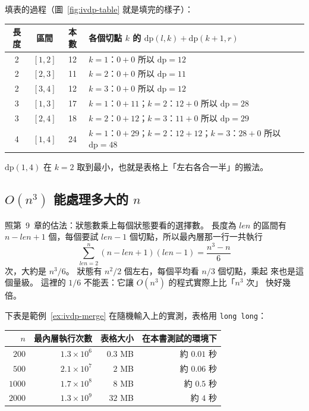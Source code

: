 填表的過程（圖~\ref{fig:ivdp-table} 就是填完的樣子）：

\begin{center}
\begin{tabular}{cccl}
\toprule
長度 & 區間 & 本數 & 各個切點 $k$ 的 $\mathrm{dp}(l, k) + \mathrm{dp}(k + 1, r)$ \\
\midrule
2 & $[1, 2]$ & 12 & $k = 1$：$0 + 0$ \quad 所以 $\mathrm{dp} = 12$ \\
2 & $[2, 3]$ & 11 & $k = 2$：$0 + 0$ \quad 所以 $\mathrm{dp} = 11$ \\
2 & $[3, 4]$ & 12 & $k = 3$：$0 + 0$ \quad 所以 $\mathrm{dp} = 12$ \\
3 & $[1, 3]$ & 17 & $k = 1$：$0 + 11$；$k = 2$：$12 + 0$ \quad 所以 $\mathrm{dp} = 28$ \\
3 & $[2, 4]$ & 18 & $k = 2$：$0 + 12$；$k = 3$：$11 + 0$ \quad 所以 $\mathrm{dp} = 29$ \\
4 & $[1, 4]$ & 24 & $k = 1$：$0 + 29$；$k = 2$：$12 + 12$；$k = 3$：$28 + 0$ \quad 所以 $\mathrm{dp} = 48$ \\
\bottomrule
\end{tabular}
\end{center}

$\mathrm{dp}(1, 4)$ 在 $k = 2$ 取到最小，也就是表格上「左右各合一半」的搬法。

\subsection{$O(n^3)$ 能處理多大的 $n$}
\label{sec:ivdp-cost}

照第~9~章的估法：狀態數乘上每個狀態要看的選擇數。 長度為 $len$ 的區間有
$n - len + 1$ 個，每個要試 $len - 1$ 個切點，所以最內層那一行一共執行
\[
\sum_{len = 2}^{n} (n - len + 1)(len - 1) = \frac{n^3 - n}{6}
\]
次，大約是 $n^3 / 6$。 狀態有 $n^2/2$ 個左右，每個平均看 $n/3$ 個切點，乘起
來也是這個量級。 這裡的 $1/6$ 不能丟：它讓 $O(n^3)$ 的程式實際上比「$n^3$ 次」
快好幾倍。

下表是範例~\ref{ex:ivdp-merge} 在隨機輸入上的實測，表格用 \texttt{long long}：

\begin{center}
\begin{tabular}{rrrr}
\toprule
$n$ & 最內層執行次數 & 表格大小 & 在本書測試的環境下 \\
\midrule
$200$ & $1.3 \times 10^{6}$ & $0.3$ MB & 約 $0.01$ 秒 \\
$500$ & $2.1 \times 10^{7}$ & $2$ MB & 約 $0.06$ 秒 \\
$1000$ & $1.7 \times 10^{8}$ & $8$ MB & 約 $0.5$ 秒 \\
$2000$ & $1.3 \times 10^{9}$ & $32$ MB & 約 $4$ 秒 \\
\bottomrule
\end{tabular}
\end{center}

